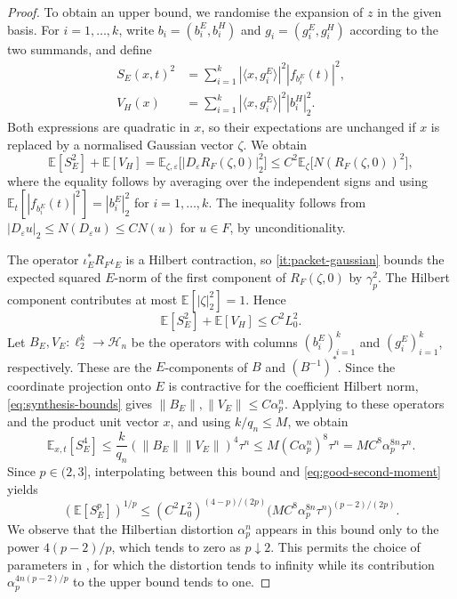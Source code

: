 \documentclass[11pt,a4paper,reqno]{amsart}
\theoremstyle{definition}
\newcommand{\eps}{\varepsilon}
\newcommand{\norm}[1]{\lVert #1\rVert}
\numberwithin{equation}{section}
\begin{document}
\begin{proof}
To obtain an upper bound, we randomise the expansion of $z$ in the given basis. For $i=1,\ldots,k$, write $b_i=(b_i^E,b_i^H)$ and $g_i=(g_i^E,g_i^H)$ according to the two summands, and define
\begin{equation*}
 \begin{aligned}
 S_E(x,t)^2&=\sum_{i=1}^k|\langle x,g_i^E\rangle|^2
                                      |f_{b_i^E}(t)|^2,\\
 V_H(x)&=\sum_{i=1}^k|\langle x,g_i^E\rangle|^2|b_i^H|_2^2.
 \end{aligned}
\end{equation*}
Both expressions are quadratic in $x$, so their expectations are unchanged if $x$ is replaced by a normalised Gaussian vector $\zeta$. We obtain
\begin{equation*}
 \mathbb E[S_E^2]+\mathbb E[V_H]
 =\mathbb E_{\zeta,\eps}\bigl[|D_\eps R_F(\zeta,0)|_2^2\bigr]
 \leq C^2\mathbb E_\zeta\bigl[N(R_F(\zeta,0))^2\bigr],
\end{equation*}
where the equality follows by averaging over the independent signs and using $\mathbb E_t[|f_{b_i^E}(t)|^2]=|b_i^E|_2^2$ for $i=1,\ldots,k$. The inequality follows from $|D_\eps u|_2\leq N(D_\eps u)\leq C N(u)$ for $u\in F$, by unconditionality.

The operator $\iota_E^*R_F\iota_E$ is a Hilbert contraction, so \ref{it:packet-gaussian} bounds the expected squared $E$-norm of the first component of $R_F(\zeta,0)$ by $\gamma_p^2$. The Hilbert component contributes at most $\mathbb E[|\zeta|_2^2]=1$. Hence
\begin{equation}\label{eq:good-second-moment}
 \mathbb E[S_E^2]+\mathbb E[V_H]\leq C^2L_0^2.
\end{equation}
Let $B_E,V_E\colon\ell_2^k\to\mathcal H_n$ be the operators with columns $(b_i^E)_{i=1}^k$ and $(g_i^E)_{i=1}^k$, respectively. These are the $E$-components of $B$ and $(B^{-1})^*$. Since the coordinate projection onto $E$ is contractive for the coefficient Hilbert norm, \eqref{eq:synthesis-bounds} gives $\norm{B_E},\norm{V_E}\leq C\alpha_p^n$. Applying  to these operators and the product unit vector $x$, and using $k/q_n\leq M$, we obtain
\begin{equation*}
 \mathbb E_{x,t}[S_E^4]
 \leq\frac{k}{q_n}(\norm{B_E}\norm{V_E})^4\tau^n
 \leq M(C\alpha_p^n)^8\tau^n
 =MC^8\alpha_p^{8n}\tau^n.
\end{equation*}
Since $p\in(2,3]$, interpolating between this bound and \eqref{eq:good-second-moment} yields
\begin{equation}\label{eq:interpolated-moment}
 (\mathbb E[S_E^p])^{1/p}
 \leq(C^2L_0^2)^{(4-p)/(2p)}
       \bigl(MC^8\alpha_p^{8n}\tau^n\bigr)^{(p-2)/(2p)}.
\end{equation}
We observe that the Hilbertian distortion $\alpha_p^n$ appears in this bound only to the power $4(p-2)/p$, which tends to zero as $p\downarrow2$. This permits the choice of parameters in , for which the distortion tends to infinity while its contribution $\alpha_p^{4n(p-2)/p}$ to the upper bound tends to one.


\end{proof}
\end{document}
